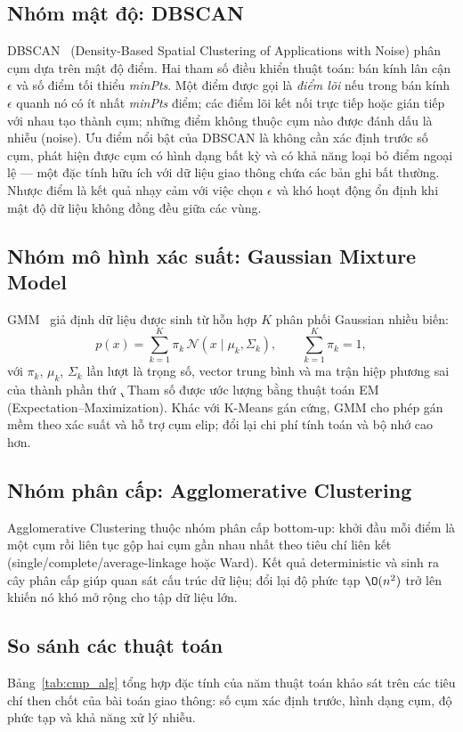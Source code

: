 \subsection{Nhóm mật độ: DBSCAN}
DBSCAN~\cite{ester} (Density-Based Spatial Clustering of Applications with Noise) phân cụm dựa trên mật độ điểm. Hai tham số điều khiển thuật toán: bán kính lân cận $\epsilon$ và số điểm tối thiểu \textit{minPts}. Một điểm được gọi là \textit{điểm lõi} nếu trong bán kính $\epsilon$ quanh nó có ít nhất \textit{minPts} điểm; các điểm lõi kết nối trực tiếp hoặc gián tiếp với nhau tạo thành cụm; những điểm không thuộc cụm nào được đánh dấu là nhiễu (noise). Ưu điểm nổi bật của DBSCAN là không cần xác định trước số cụm, phát hiện được cụm có hình dạng bất kỳ và có khả năng loại bỏ điểm ngoại lệ --- một đặc tính hữu ích với dữ liệu giao thông chứa các bản ghi bất thường. Nhược điểm là kết quả nhạy cảm với việc chọn $\epsilon$ và khó hoạt động ổn định khi mật độ dữ liệu không đồng đều giữa các vùng.

\subsection{Nhóm mô hình xác suất: Gaussian Mixture Model}
GMM~\cite{reynolds} giả định dữ liệu được sinh từ hỗn hợp $K$ phân phối Gaussian nhiều biến:
\begin{equation}
p(x) = \sum_{k=1}^{K} \pi_k \, \mathcal{N}(x \mid \mu_k, \Sigma_k), \qquad \sum_{k=1}^{K} \pi_k = 1,
\label{eq:gmm}
\end{equation}
với $\pi_k$, $\mu_k$, $\Sigma_k$ lần lượt là trọng số, vector trung bình và ma trận hiệp phương sai của thành phần thứ \k. Tham số được ước lượng bằng thuật toán EM (Expectation--Maximization). Khác với K-Means gán cứng, GMM cho phép gán mềm theo xác suất và hỗ trợ cụm elip; đổi lại chi phí tính toán và bộ nhớ cao hơn.

\subsection{Nhóm phân cấp: Agglomerative Clustering}
Agglomerative Clustering thuộc nhóm phân cấp bottom-up: khởi đầu mỗi điểm là một cụm rồi liên tục gộp hai cụm gần nhau nhất theo tiêu chí liên kết (single/complete/average-linkage hoặc Ward). Kết quả deterministic và sinh ra cây phân cấp giúp quan sát cấu trúc dữ liệu; đổi lại độ phức tạp $\O(n^2)$ trở lên khiến nó khó mở rộng cho tập dữ liệu lớn.

\subsection{So sánh các thuật toán}
Bảng~\ref{tab:cmp_alg} tổng hợp đặc tính của năm thuật toán khảo sát trên các tiêu chí then chốt của bài toán giao thông: số cụm xác định trước, hình dạng cụm, độ phức tạp và khả năng xử lý nhiễu.

